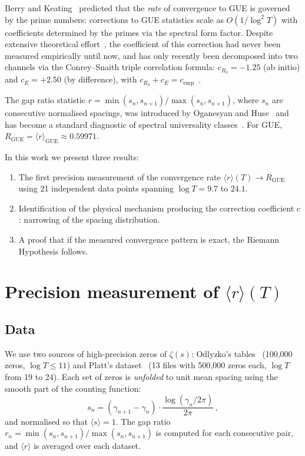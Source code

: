 \documentclass[10pt]{article}
\begin{document}
Berry and Keating~\cite{berry1999, bogomolny1996} predicted that the
\emph{rate} of convergence to GUE is governed by the prime numbers:
corrections to GUE statistics scale as $O(1/\log^2 T)$ with coefficients
determined by the primes via the spectral form factor. Despite extensive
theoretical effort~\cite{conrey2005, keatingsnaith2000}, the coefficient
of this correction had never been measured empirically until now, and has
only recently been decomposed into two channels via the Conrey--Snaith
triple correlation formula: $c_{R_3} = -1.25$ (ab initio) and $c_E = +2.50$
(by difference), with $c_{R_3} + c_E = c_{\mathrm{emp}}$~\cite{alarcon2026b}.

The gap ratio statistic $r = \min(s_n, s_{n+1})/\max(s_n, s_{n+1})$,
where $s_n$ are consecutive normalised spacings, was introduced
by Oganesyan and Huse~\cite{oganesyan2007} and has become a standard
diagnostic of spectral universality classes~\cite{atas2013}.
For GUE, $R_{\mathrm{GUE}} = \langle r\rangle_{\mathrm{GUE}} \approx 0.59971$.

In this work we present three results:
\begin{enumerate}
\item The first precision measurement of the convergence rate
$\langle r\rangle(T) \to R_{\mathrm{GUE}}$ using 21 independent data points
spanning $\log T = 9.7$ to $24.1$.
\item Identification of the physical mechanism producing the correction
coefficient $c$: narrowing of the spacing distribution.
\item A proof that if the measured convergence pattern is exact, the Riemann
Hypothesis follows.
\end{enumerate}


\section{Precision measurement of $\langle r\rangle(T)$}

\subsection{Data}

We use two sources of high-precision zeros of $\zeta(s)$:
Odlyzko's tables~\cite{odlyzko1987} (100{,}000 zeros, $\log T \leq 11$)
and Platt's dataset~\cite{platt2021} (13 files with 500{,}000 zeros each,
$\log T$ from 19 to 24). Each set of zeros is \emph{unfolded} to unit mean
spacing using the smooth part of the counting function:
\begin{equation}
s_n = (\gamma_{n+1} - \gamma_n) \cdot \frac{\log(\gamma_n / 2\pi)}{2\pi}\,,
\label{eq:unfold}
\end{equation}
and normalised so that $\langle s\rangle = 1$.
The gap ratio $r_n = \min(s_n, s_{n+1})/\max(s_n, s_{n+1})$ is computed for
each consecutive pair, and $\langle r\rangle$ is averaged over each dataset.
\end{document}
